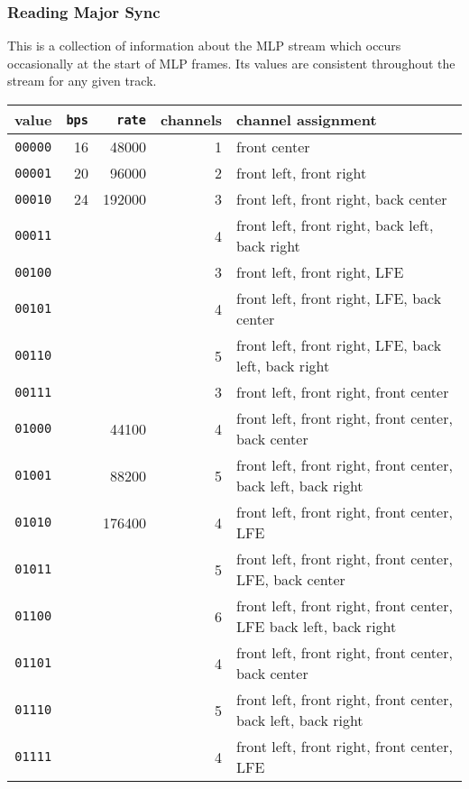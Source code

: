 \subsubsection{Reading Major Sync}
\label{mlp:readmajorsync}
This is a collection of information about the MLP stream
which occurs occasionally at the start of MLP frames.
Its values are consistent throughout the stream for any given track.
\par
\noindent
{
  
}
\begin{tiny}
  \begin{tabular}{|c|r|r|r|l|}
    \hline
    value & \texttt{bps} & \texttt{rate} & channels & channel assignment \\
    \hline
    \texttt{00000} & 16 & 48000 & 1 & front center \\
    \texttt{00001} & 20 & 96000 & 2 & front left, front right\\
    \texttt{00010} & 24 & 192000 & 3 & front left, front right, back center \\
    \texttt{00011} & & & 4 & front left, front right, back left, back right\\
    \texttt{00100} & & & 3 & front left, front right, LFE \\
    \texttt{00101} & & & 4 & front left, front right, LFE, back center \\
    \texttt{00110} & & & 5 & front left, front right, LFE, back left, back right \\
    \texttt{00111} & & & 3 & front left, front right, front center \\
    \texttt{01000} & & 44100 & 4 & front left, front right, front center, back center \\
    \texttt{01001} & & 88200 & 5 & front left, front right, front center, back left, back right \\
    \texttt{01010} & & 176400 & 4 & front left, front right, front center, LFE\\
    \texttt{01011} & & & 5 & front left, front right, front center, LFE, back center \\
    \texttt{01100} & & & 6 & front left, front right, front center, LFE back left, back right \\
    \texttt{01101} & & & 4 & front left, front right, front center, back center \\
    \texttt{01110} & & & 5 & front left, front right, front center, back left, back right \\
    \texttt{01111} & & & 4 & front left, front right, front center, LFE \\

\end{tabular}
\end{tiny}
